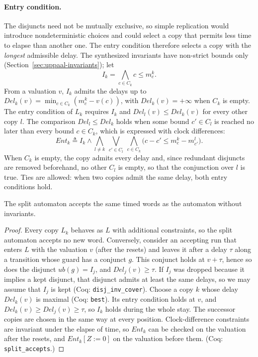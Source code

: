 \paragraph{Entry condition.}
The disjuncts need not be mutually exclusive, so simple replication would
introduce nondeterministic choices and could select a copy that permits less
time to elapse than another one.  The entry condition therefore selects a copy
with the \emph{longest} admissible delay.  The synthesized invariants have
non-strict bounds only (Section~\ref{sec:uppaal-invariants}); let
\[
  I_k = \bigwedge_{c\in C_k} c\le m^k_c.
\]
From a valuation $v$, $I_k$ admits the delays up to
$\mathit{Del}_k(v)=\min_{c\in C_k}(m^k_c-v(c))$, with $\mathit{Del}_k(v)=+\infty$ when $C_k$ is
empty.  The entry condition of $L_k$ requires $I_k$ and $\mathit{Del}_l(v)\le \mathit{Del}_k(v)$ for
every other copy $l$.  The comparison $\mathit{Del}_l\le \mathit{Del}_k$ holds when some bound
$c'\in C_l$ is reached no later than every bound $c\in C_k$, which is expressed
with clock differences:
\[
\mathit{Ent}_k\triangleq I_k \land
\bigwedge_{l\neq k}\ \bigvee_{c'\in C_l}\ \bigwedge_{c\in C_k}
 \bigl(c-c'\le m^k_c-m^l_{c'}\bigr).
\]
When $C_k$ is empty, the copy admits every delay and, since redundant
disjuncts are removed beforehand, no other $C_l$ is empty, so that the
conjunction over $l$ is true.  Ties are allowed: when two copies admit the same delay, both entry
conditions hold.

\begin{theorem}
\label{thm:split}
The split automaton accepts the same timed words as the automaton without
invariants.
\end{theorem}

\begin{proof}
Every copy $L_k$ behaves as $L$ with additional constraints, so the split
automaton accepts no new word.  Conversely, consider an accepting run that
enters $L$ with the valuation $v$ (after the resets) and leaves it after a
delay $\tau$ along a transition whose guard has a conjunct $g$.  This
conjunct holds at $v+\tau$, hence so does the disjunct $\mathit{ub}(g)=I_j$,
and $\mathit{Del}_j(v)\ge\tau$.  If $I_j$ was dropped because it implies a kept disjunct, that disjunct admits
at least the same delays, so we may assume that $I_j$ is kept (Coq:
\texttt{disj\_\allowbreak{}inv\_\allowbreak{}cover}).  Choose a copy $k$ whose delay
$\mathit{Del}_k(v)$ is maximal (Coq: \texttt{best}).  Its entry condition holds at $v$, and
$\mathit{Del}_k(v)\ge \mathit{Del}_j(v)\ge\tau$,
so $I_k$ holds during the whole stay.  The successor copies are chosen in the
same way at every position.  Clock-difference constraints are invariant under
the elapse of time, so $\mathit{Ent}_k$ can be checked on the valuation after the resets,
and $\mathit{Ent}_k[Z:=0]$ on the valuation before them.  (Coq:
\texttt{split\_\allowbreak{}accepts}.)
\end{proof}

